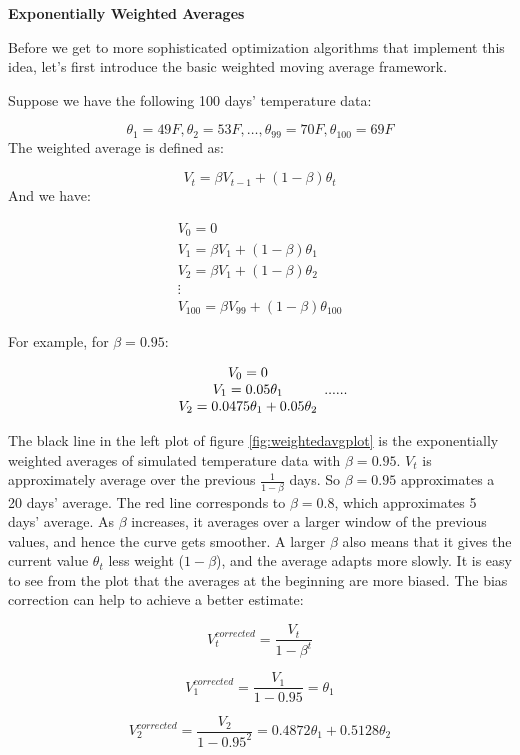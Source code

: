 \documentclass[
  12pt,
]{krantz}
\begin{document}
\textbf{Exponentially Weighted Averages}

Before we get to more sophisticated optimization algorithms that implement this idea, let's first introduce the basic weighted moving average framework.

Suppose we have the following 100 days' temperature data:

\[ \theta_{1}=49F, \theta_{2}=53F, \dots, \theta_{99}=70F, \theta_{100}=69F\]
The weighted average is defined as:

\[V_t = \beta V_{t-1}+(1-\beta)\theta_t\]
And we have:

\[
\begin{array}{c} V_{0}=0\\ V_{1}=\beta V_1 + (1-\beta)\theta_1\\ V_2=\beta V_1 + (1-\beta)\theta_2\\ \vdots \\ V_{100}= \beta V_{99} + (1-\beta)\theta_{100} \end{array}\]

For example, for \(\beta=0.95\):

\[\begin{array}{c} V_{0}=0 \\ V_{1}=0.05\theta_{1}  \\ V_{2}=0.0475\theta_{1}+0.05\theta_{2}   \end{array} \\ ......\]

The black line in the left plot of figure \ref{fig:weightedavgplot} is the exponentially weighted averages of simulated temperature data with \(\beta = 0.95\). \(V_t\) is approximately average over the previous \(\frac{1}{1-\beta}\) days. So \(\beta = 0.95\) approximates a 20 days' average. The red line corresponds to \(\beta = 0.8\), which approximates 5 days' average. As \(\beta\) increases, it averages over a larger window of the previous values, and hence the curve gets smoother. A larger \(\beta\) also means that it gives the current value \(\theta_t\) less weight (\(1-\beta\)), and the average adapts more slowly. It is easy to see from the plot that the averages at the beginning are more biased. The bias correction can help to achieve a better estimate:

\[V_t^{corrected} = \frac{V_t}{1-\beta^t}\]

\[V_{1}^{corrected}=\frac{V_{1}}{1-0.95}=\theta_{1}\]

\[V_{2}^{corrected}=\frac{V_{2}}{1-0.95^{2}}=0.4872\theta_{1}+0.5128\theta_{2}\]
\end{document}
